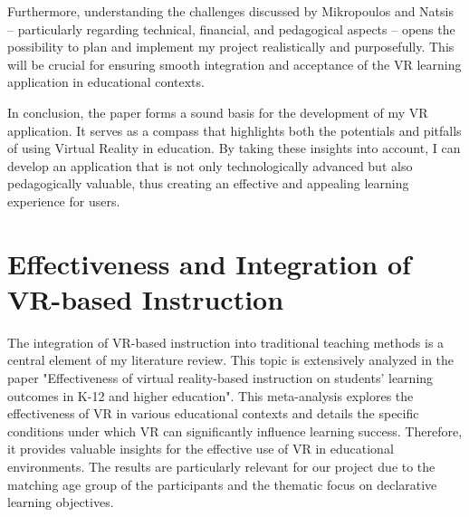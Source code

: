 \documentclass[draft, final]{vutinfth} %
\begin{document}
Furthermore, understanding the challenges discussed by Mikropoulos and Natsis -- particularly regarding technical, financial, and pedagogical aspects -- opens the possibility to plan and implement my project realistically and purposefully. This will be crucial for ensuring smooth integration and acceptance of the VR learning application in educational contexts.

In conclusion, the paper forms a sound basis for the development of my VR application. It serves as a compass that highlights both the potentials and pitfalls of using Virtual Reality in education. By taking these insights into account, I can develop an application that is not only technologically advanced but also pedagogically valuable, thus creating an effective and appealing learning experience for users.

\section{Effectiveness and Integration of VR-based Instruction}

The integration of VR-based instruction into traditional teaching methods is a central element of my literature review. This topic is extensively analyzed in the paper "Effectiveness of virtual reality-based instruction on students' learning outcomes in K-12 and higher education"\cite{merchant2014effectiveness}. This meta-analysis explores the effectiveness of VR in various educational contexts and details the specific conditions under which VR can significantly influence learning success. Therefore, it provides valuable insights for the effective use of VR in educational environments. The results are particularly relevant for our project due to the matching age group of the participants and the thematic focus on declarative learning objectives.
\end{document}
